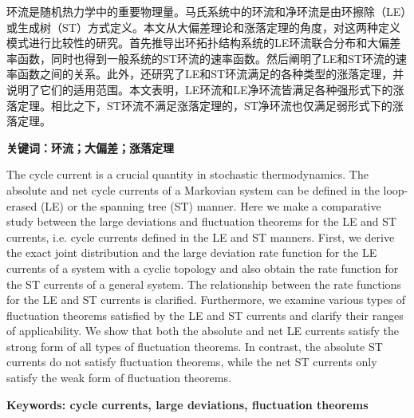 
\setcounter{page}{1}
\song{}

环流是随机热力学中的重要物理量。马氏系统中的环流和净环流是由环擦除（LE）或生成树（ST）方式定义。本文从大偏差理论和涨落定理的角度，对这两种定义模式进行比较性的研究。首先推导出环拓扑结构系统的LE环流联合分布和大偏差率函数，同时也得到一般系统的ST环流的速率函数。然后阐明了LE和ST环流的速率函数之间的关系。此外，还研究了LE和ST环流满足的各种类型的涨落定理，并说明了它们的适用范围。本文表明，LE环流和LE净环流皆满足各种强形式下的涨落定理。相比之下，ST环流不满足涨落定理的，ST净环流也仅满足弱形式下的涨落定理。

\vspace{\baselineskip}

\hangindent=52.3pt\noindent
{\bfseries\xiaosi\song 关键词：环流；大偏差；涨落定理}
\clearpage


The cycle current is a crucial quantity in stochastic thermodynamics. The absolute and net cycle currents of a Markovian system can be defined in the loop-erased (LE) or the spanning tree (ST) manner. Here we make a comparative study between the large deviations and fluctuation theorems for the LE and ST currents, i.e. cycle currents defined in the LE and ST manners. First, we derive the exact joint distribution and the large deviation rate function for the LE currents of a system with a cyclic topology and also obtain the rate function for the ST currents of a general system. The relationship between the rate functions for the LE and ST currents is clarified. Furthermore, we examine various types of fluctuation theorems satisfied by the LE and ST currents and clarify their ranges of applicability. We show that both the absolute and net LE currents satisfy the strong form of all types of fluctuation theorems. In contrast, the absolute ST currents do not satisfy fluctuation theorems, while the net ST currents only satisfy the weak form of fluctuation theorems.

\vspace{\baselineskip}

\hangindent=60pt\noindent
{\textbf{\xiaosi Keywords: cycle currents, large deviations, fluctuation theorems}}
\clearpage
